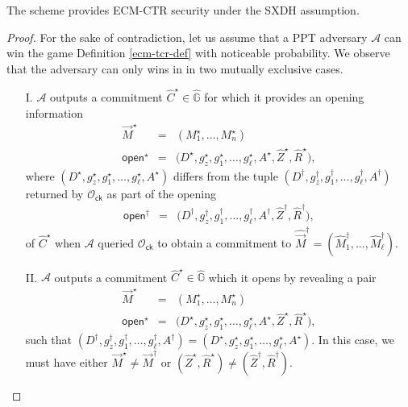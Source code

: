 \documentclass[10pt]{llncs}
\newcommand{\A}{\mathcal{A}}
\newcommand{\G}{\mathbb{G}}
\newcommand{\ck}{\mathsf{ck}}
\newcommand{\open}{\mathsf{open}}
\begin{document}
\begin{theorem} \label{ecm-ctr-sec}
The scheme provides ECM-CTR security under the SXDH assumption.
\end{theorem}
\begin{proof}
For the sake of contradiction, let us assume that a PPT adversary $\A$ can win the game Definition \ref{ecm-tcr-def} with noticeable 
probability. 
We observe that the adversary can only wins in in two mutually exclusive cases.
\begin{itemize}
\item[I.] $\A$ outputs a commitment $\hat{C}^\star \in \hat{\G}$  for which it provides an opening information   
\begin{eqnarray*}
\vec{M}^\star &=& (M_1^\star, \ldots , M_n^\star) \\ 
\open^\star  &=& \big( D^\star, g_z^\star, g_1^\star, \ldots, g_\ell^\star, A^\star , \hat{Z}^\star , \hat{R}^\star \big) ,
\end{eqnarray*}
 where $(D^\star, g_z^\star, g_1^\star, \ldots, g_\ell^\star, A^\star )$ differs from  
the tuple   $(D^\dagger, g_z^\dagger, g_1^\dagger, \ldots, g_\ell^\dagger, A^\dagger )$ returned by $\mathcal{O}_{\ck}$ as part of the opening 
\begin{eqnarray*}
\open^\dagger  &=& \big( D^\dagger, g_z^\dagger, g_1^\dagger, \ldots, g_\ell^\dagger, A^\dagger , \hat{Z}^\dagger , \hat{R}^\dagger \big) ,
\end{eqnarray*}
of $\hat{C}^\star  $ when $\A$ queried $\mathcal{O}_{\ck}$   to obtain a commitment to  $\hat{\vec{M}}^\dagger=(\hat{M}_1^\dagger,\ldots,\hat{M}_{\ell}^\dagger) $.  

\item[II.] $\A$ outputs a commitment $\hat{C}^\star \in \hat{\G}$    which it opens by revealing a pair   
\begin{eqnarray*}
\vec{M}^\star &=& (M_1^\star, \ldots , M_n^\star) \\ 
\open^\star  &=& \big( D^\star, g_z^\star, g_1^\star, \ldots, g_\ell^\star, A^\star , \hat{Z}^\star , \hat{R}^\star \big) ,
\end{eqnarray*}
such that 
 $(D^\dagger, g_z^\dagger, g_1^\dagger, \ldots, g_\ell^\dagger, A^\dagger )=  (D^\star, g_z^\star, g_1^\star, \ldots, g_\ell^\star, A^\star ) $.
In this case, we must have either $\vec{M}^\star \neq \vec{M}^\dagger$ or $(\hat{Z}^\star,\hat{R}^\star) \neq (\hat{Z}^\dagger,\hat{R}^\dagger)$.   
\end{itemize}
\medskip 


\end{proof}
\end{document}
